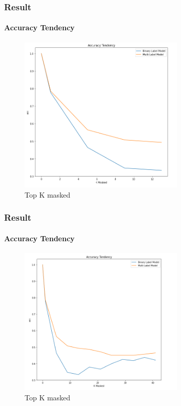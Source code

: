 \documentclass{beamer}
\begin{document}
\begin{frame}
    \frametitle{Result}
    \framesubtitle{Accuracy Tendency}
    \begin{figure}
        \centering
            \includegraphics[width=0.7\textwidth]{Accuracy Tendency.png}
            \caption{Top K masked}
            \label{fig:MaskedExample}
    \end{figure}
\end{frame}

\begin{frame}
    \frametitle{Result}
    \framesubtitle{Accuracy Tendency}
    \begin{figure}
        \centering
            \includegraphics[width=0.7\textwidth]{Accuracy Tendency2.png}
            \caption{Top K masked}
            \label{fig:MaskedExample}
    \end{figure}
\end{frame}
\end{document}
